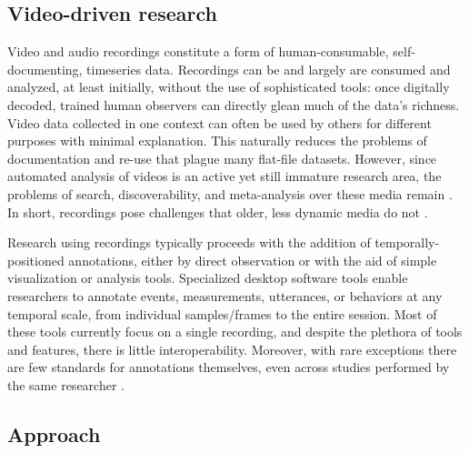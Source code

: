 \documentclass{sig-alternate}
\begin{document}
\subsection{Video-driven research}

Video and audio recordings constitute a form of human-consumable, self-documenting, timeseries data.
Recordings can be and largely are consumed and analyzed, at least initially, without the use of sophisticated tools: once digitally decoded, trained human observers can directly glean much of the data's richness.
Video data collected in one context can often be used by others for different purposes with minimal explanation.
This naturally reduces the problems of documentation and re-use that plague many flat-file datasets. %
However, since automated analysis of videos is an active yet still immature research area, the problems of search, discoverability, and meta-analysis over these media remain \cite{Albertson_2013}. In short, recordings pose challenges that older, less dynamic media do not \cite{Lanagan_Smeaton_2012}.

Research using recordings typically proceeds with the addition of temporally-positioned annotations, either by direct observation or with the aid of simple visualization or analysis tools.
Specialized %
desktop software tools enable researchers to annotate events, measurements, utterances, or behaviors at any temporal scale, from individual samples/frames to the entire session.
Most of these tools currently focus on a single recording, and despite the plethora of tools and features, there is little interoperability.
Moreover, with rare exceptions \cite{MacWhinney2001} there are few standards for annotations themselves, even across studies performed by the same researcher \cite{?}. %

\subsection{Approach}
\end{document}
